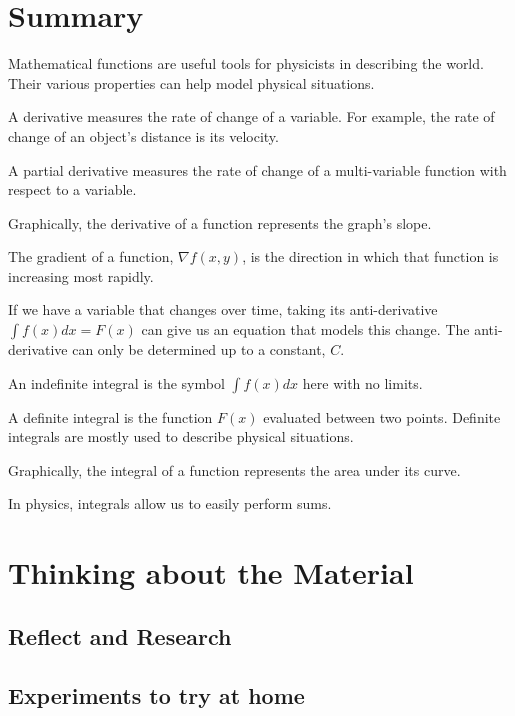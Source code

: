 \section{Summary}
\vspace{2cm}
\begin{chapterSummary}
\item Mathematical functions are useful tools for physicists in describing the world. Their various properties can help model physical situations.
\item A derivative measures the rate of change of a variable. For example, the rate of change of an object's distance is its velocity.
\item A partial derivative measures the rate of change of a multi-variable function with respect to a variable. 
\item Graphically, the derivative of a function represents the graph's slope.
\item The gradient of a function, $\nabla f(x,y)$, is the direction in which that function is increasing most rapidly.
\item If we have a variable that changes over time, taking its anti-derivative $\int f(x)dx=F(x)$ can give us an equation that models this change. The anti-derivative can only be determined up to a constant, $C$. 
\item An indefinite integral is the symbol $\int f(x) dx$ here with no limits. 
\item A definite integral is the function $F(x)$ evaluated between two points. Definite integrals are mostly used to describe physical situations.
\item Graphically, the integral of a function represents the area under its curve.
\item In physics, integrals allow us to easily perform sums.
\end{chapterSummary}
\vspace{2cm}
\section{Thinking about the Material}

\subsection{Reflect and Research}

\subsection{Experiments to try at home}

